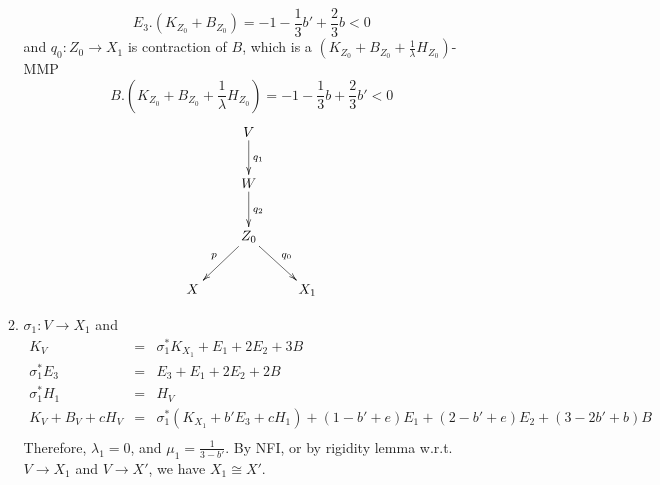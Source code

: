 \documentclass{article}
\begin{document}
\begin{enumerate}[(A)]
\begin{enumerate}[(1)]
    $$ E_3.(K_{Z_0}+B_{Z_0})=-1-\frac{1}{3}b'+\frac{2}{3}b<0 $$
    and $ q_0:Z_0\to X_1 $ is contraction of $ B $, which is a $ (K_{Z_0}+B_{Z_0}+\frac{1}{\lambda}H_{Z_0}) $-MMP
    $$ B.(K_{Z_0}+B_{Z_0}+\frac{1}{\lambda}H_{Z_0})=-1-\frac{1}{3}b+\frac{2}{3}b'<0 $$
    $$ \xymatrix{
      &V\ar[d]^{q_1}&\\
      &W\ar[d]^{q_2}&\\
      &Z_0\ar[dl]_p\ar[dr]^{q_0}\\
      X&&X_1  } $$
      \item $ \sigma_1:V\to X_1 $ and 
      $$ \begin{array}{rcl}
        K_V&=&\sigma_1^*K_{X_1}+E_1+2E_2+3B \\
        \sigma_1^*E_3&=&E_3+E_1+2E_2+2B\\
        \sigma_1^*H_1&=&H_V\\
        K_V+B_V+cH_V&=&\sigma_1^*(K_{X_1}+b'E_3+cH_1)+(1-b'+e)E_1+(2-b'+e)E_2+(3-2b'+b)B\\
      \end{array} $$
    Therefore, $ \lambda_1=0 $, and $ \mu_1=\frac{1}{3-b'} $. By NFI, or by rigidity lemma w.r.t. $ V\to X_1 $ and $ V\to X' $, we have $ X_1\cong X' $.
    

\end{enumerate}
\end{enumerate}
\end{document}
